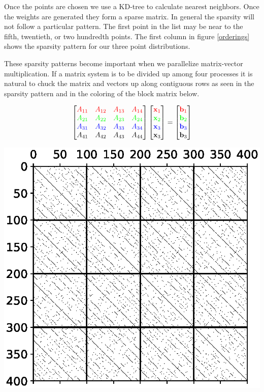 \documentclass[12pt]{article}
\let\vec\mathbf
\begin{document}
Once the points are chosen we use a KD-tree to calculate nearest neighbors. Once the weights are generated they form a sparse matrix. In general the sparsity will not follow a particular pattern. The first point in the list may be near to the fifth, twentieth, or two hundredth points. The first column in figure \ref{orderings} shows the sparsity pattern for our three point distributions.

These sparsity patterns become important when we parallelize matrix-vector multiplication. If a matrix system is to be divided up among four processes it is natural to chuck the matrix and vectors up along contiguous rows as seen in the sparsity pattern and in the coloring of the block matrix below.

$$
\begin{bmatrix}
{\color{red} A_{11} } & {\color{red} A_{12} } & {\color{red} A_{13} } & {\color{red} A_{14} }\\
{\color{green} A_{21} } & {\color{green} A_{22} } & {\color{green} A_{23} } & {\color{green} A_{24} } \\
{\color{blue} A_{31} } & {\color{blue} A_{32} } & {\color{blue} A_{33} } & {\color{blue} A_{34} } \\
{\color{black} A_{41} } & {\color{black} A_{42} } & {\color{black} A_{43} } & {\color{black} A_{44} } \\
\end{bmatrix}
\begin{bmatrix}
{\color{red} \vec{x}_{1} } \\
{\color{green} \vec{x}_{2} } \\
{\color{blue} \vec{x}_{3} } \\
{\color{black} \vec{x}_{3} } 
\end{bmatrix}
=
\begin{bmatrix}
{\color{red} \vec{b}_{1} } \\
{\color{green} \vec{b}_{2} } \\
{\color{blue} \vec{b}_{3} } \\
{\color{black} \vec{b}_{3} }
\end{bmatrix}
$$
\begin{center}
	\includegraphics[width=.5\textwidth]{spy_halton_chunked.eps}
\end{center}
\end{document}
